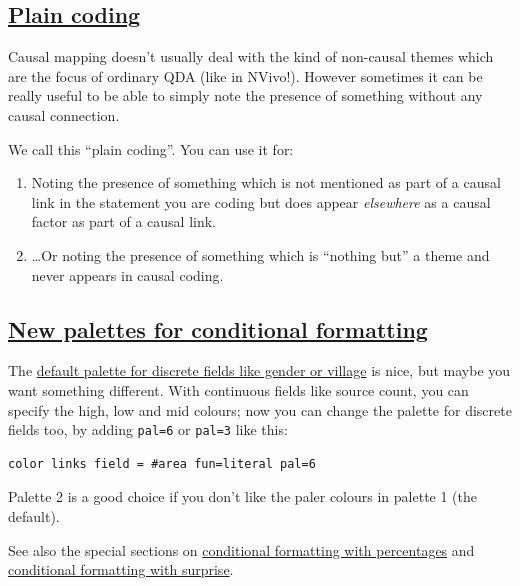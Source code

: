 \documentclass[
]{book}
\providecommand{\tightlist}{%
  \setlength{\itemsep}{0pt}\setlength{\parskip}{0pt}}
\begin{document}
\hypertarget{plain-coding}{%
\subsection{\texorpdfstring{\protect\hyperlink{plain-coding}{Plain coding}}{Plain coding}}\label{plain-coding}}

Causal mapping doesn't usually deal with the kind of non-causal themes which are the focus of ordinary QDA (like in NVivo!). However sometimes it can be really useful to be able to simply note the presence of something without any causal connection.

We call this ``plain coding''. You can use it for:

\begin{enumerate}
\def\labelenumi{\arabic{enumi}.}
\tightlist
\item
  Noting the presence of something which is not mentioned as part of a causal link in the statement you are coding but does appear \emph{elsewhere} as a causal factor as part of a causal link.
\item
  \ldots Or noting the presence of something which is ``nothing but'' a theme and never appears in causal coding.
\end{enumerate}

\hypertarget{new-palettes-for-conditional-formatting}{%
\subsection{\texorpdfstring{\protect\hyperlink{xconditional-formats}{New palettes for conditional formatting}}{New palettes for conditional formatting}}\label{new-palettes-for-conditional-formatting}}

The \href{https://colorbrewer2.org/\#type=qualitative\&scheme=Set1\&n=9}{default palette for discrete fields like gender or village} is nice, but maybe you want something different. With continuous fields like source count, you can specify the high, low and mid colours; now you can change the palette for discrete fields too, by adding \texttt{pal=6} or \texttt{pal=3} like this:

\begin{verbatim}
color links field = #area fun=literal pal=6
\end{verbatim}

Palette 2 is a good choice if you don't like the paler colours in palette 1 (the default).

See also the special sections on \protect\hyperlink{percent}{conditional formatting with percentages} and \protect\hyperlink{xsurprise}{conditional formatting with surprise}.
\end{document}
